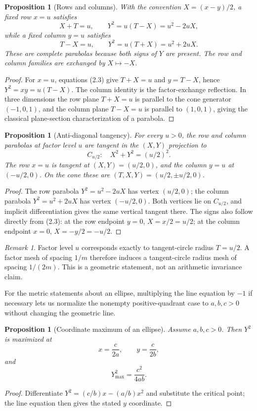 \documentclass[11pt]{amsart}
\newtheorem{proposition}[theorem]{Proposition}
\theoremstyle{remark}
\newtheorem*{remark}{Remark}
\begin{document}
\begin{proposition}[Rows and columns]\label{prop:rows}
With the convention $X=(x-y)/2$, a fixed row $x=u$ satisfies
\[
X+T=u,\qquad Y^2=u(T-X)=u^2-2uX,
\]
while a fixed column $y=u$ satisfies
\[
T-X=u,\qquad Y^2=u(T+X)=u^2+2uX.
\]
These are complete parabolas because both signs of $Y$ are present. The row and column families are exchanged by $X\mapsto-X$.
\end{proposition}

\begin{proof}
For $x=u$, equations (2.3) give $T+X=u$ and $y=T-X$, hence $Y^2=xy=u(T-X)$. The column identity is the factor-exchange reflection. In three dimensions the row plane $T+X=u$ is parallel to the cone generator $(-1,0,1)$, and the column plane $T-X=u$ is parallel to $(1,0,1)$, giving the classical plane-section characterization of a parabola.
\end{proof}

\begin{proposition}[Anti-diagonal tangency]\label{prop:tangent}
For every $u>0$, the row and column parabolas at factor level $u$ are tangent in the $(X,Y)$ projection to
\[
C_{u/2}:\quad X^2+Y^2=(u/2)^2.
\]
The row $x=u$ is tangent at $(X,Y)=(u/2,0)$, and the column $y=u$ at $(-u/2,0)$. On the cone these are $(T,X,Y)=(u/2,\pm u/2,0)$.
\end{proposition}
\begin{proof}
The row parabola $Y^2=u^2-2uX$ has vertex $(u/2,0)$; the column parabola $Y^2=u^2+2uX$ has vertex $(-u/2,0)$. Both vertices lie on $C_{u/2}$, and implicit differentiation gives the same vertical tangent there. The signs also follow directly from (2.3): at the row endpoint $y=0$, $X=x/2=u/2$; at the column endpoint $x=0$, $X=-y/2=-u/2$.
\end{proof}

\begin{remark}
Factor level $u$ corresponds exactly to tangent-circle radius $T=u/2$. A factor mesh of spacing $1/m$ therefore induces a tangent-circle radius mesh of spacing $1/(2m)$. This is a geometric statement, not an arithmetic invariance claim.
\end{remark}

For the metric statements about an ellipse, multiplying the line equation by $-1$ if necessary lets us normalize the nonempty positive-quadrant case to $a,b,c>0$ without changing the geometric line.

\begin{proposition}[Coordinate maximum of an ellipse]\label{prop:semiaxes}
Assume $a,b,c>0$. Then $Y^2$ is maximized at
\[
x=\frac{c}{2a},\qquad y=\frac{c}{2b},
\]
and
\[
Y_{\max}^2=\frac{c^2}{4ab}.
\]
\end{proposition}
\begin{proof}
Differentiate $Y^2=(c/b)x-(a/b)x^2$ and substitute the critical point; the line equation then gives the stated $y$ coordinate.
\end{proof}
\end{document}
